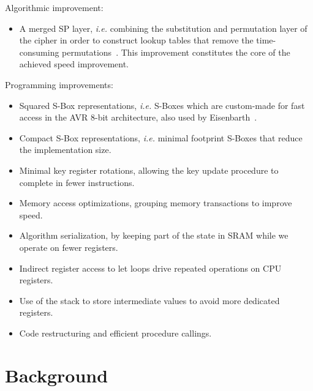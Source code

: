 \documentclass[11pt]{llncs2e} %
\begin{document}
Algorithmic improvement:
\begin{itemize}[nolistsep]
  \item A merged SP layer, \emph{i.e.} combining the substitution and permutation layer of the cipher in order to construct lookup tables that remove the time-consuming permutations~\cite{gong_code,gong2009towards}. This improvement constitutes the core of the achieved speed improvement.
\end{itemize}
Programming improvements:
\begin{itemize}[nolistsep]
  \item Squared S-Box representations, \emph{i.e.} S-Boxes which are custom-made for fast access in the AVR 8-bit architecture, also used by Eisenbarth~\cite{eisenbarth2012compact}.
  \item Compact S-Box representations, \emph{i.e.} minimal footprint S-Boxes that reduce the implementation size.
  \item Minimal key register rotations, allowing the key update procedure to complete in fewer instructions.
  \item Memory access optimizations, grouping memory transactions to improve speed.
  \item Algorithm serialization, by keeping part of the state in SRAM while we operate on fewer registers.
  \item Indirect register access to let loops drive repeated operations on CPU registers.
  \item Use of the stack to store intermediate values to avoid more dedicated registers.
  \item Code restructuring and efficient procedure callings.
\end{itemize}

\section{Background}
\end{document}
